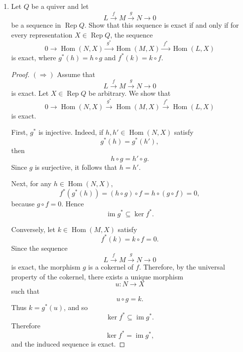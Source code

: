 \documentclass[11pt, a4paper]{article}
\begin{document}
\begin{enumerate}[leftmargin=*, label=\textbf{\arabic*.}]
\begin{proof}
    Therefore $a$ and $b$ are inverse isomorphisms, so $N\cong H$. This proves that any cokernel in the universal-property sense is isomorphic to the pointwise cokernel. Hence the two definitions agree.
    \end{proof}

\item Let $Q$ be a quiver and let
\[
L \xrightarrow{\;f\;} M \xrightarrow{\;g\;} N \longrightarrow 0
\]
be a sequence in $\operatorname{Rep} Q$. Show that this sequence is exact if and only if for every representation $X \in \operatorname{Rep} Q$, the sequence
\[
0 \longrightarrow \operatorname{Hom}(N, X) \xrightarrow{\;g^\ast\;} \operatorname{Hom}(M, X) \xrightarrow{\;f^\ast\;} \operatorname{Hom}(L, X)
\]
is exact, where $g^\ast(h) = h \circ g$ and $f^\ast(k) = k \circ f$.

\begin{proof}
    $(\Rightarrow)$ Assume that
    \[
    L \xrightarrow{f} M \xrightarrow{g} N \longrightarrow 0
    \]
    is exact. Let $X \in \operatorname{Rep}Q$ be arbitrary. We show that
    \[
    0 \longrightarrow \operatorname{Hom}(N,X)
    \xrightarrow{\,g^\ast\,}
    \operatorname{Hom}(M,X)
    \xrightarrow{\,f^\ast\,}
    \operatorname{Hom}(L,X)
    \]
    is exact.
    
    First, $g^\ast$ is injective. Indeed, if $h,h' \in \operatorname{Hom}(N,X)$ satisfy
    \[
    g^\ast(h)=g^\ast(h'),
    \]
    then
    \[
    h\circ g=h'\circ g.
    \]
    Since $g$ is surjective, it follows that $h=h'$.
    
    Next, for any $h \in \operatorname{Hom}(N,X)$,
    \[
    f^\ast(g^\ast(h))=(h\circ g)\circ f=h\circ(g\circ f)=0,
    \]
    because $g\circ f=0$. Hence
    \[
    \operatorname{im} g^\ast \subseteq \ker f^\ast.
    \]
    
    Conversely, let $k \in \operatorname{Hom}(M,X)$ satisfy
    \[
    f^\ast(k)=k\circ f=0.
    \]
    Since the sequence
    \[
    L \xrightarrow{f} M \xrightarrow{g} N \longrightarrow 0
    \]
    is exact, the morphism $g$ is a cokernel of $f$. Therefore, by the universal
    property of the cokernel, there exists a unique morphism
    \[
    u:N\to X
    \]
    such that
    \[
    u\circ g=k.
    \]
    Thus $k=g^\ast(u)$, and so
    \[
    \ker f^\ast \subseteq \operatorname{im} g^\ast.
    \]
    Therefore
    \[
    \ker f^\ast=\operatorname{im} g^\ast,
    \]
    and the induced sequence is exact.
    

\end{proof}
\end{enumerate}
\end{document}
